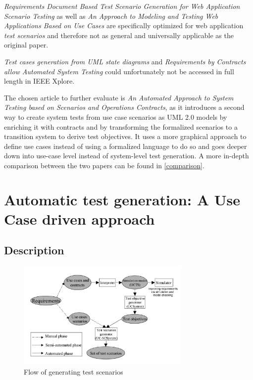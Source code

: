 \textit{Requirements Document Based Test Scenario Generation for Web Application Scenario Testing} as well as \textit{An Approach to Modeling and Testing Web Applications Based on Use Cases} are specifically optimized for web application \textit{test scenarios} and therefore not as general and universally applicable as the original paper.

\textit{Test cases generation from UML state diagrams} and \textit{Requirements by Contracts allow Automated System Testing} could unfortunately not be accessed in full length in IEEE Xplore.

The chosen article to further evaluate is \textit{An Automated Approach to System Testing based on Scenarios and Operations Contracts}, as it introduces a second way to create system tests from use case scenarios as UML 2.0 models by enriching it with contracts and by transforming the formalized scenarios to a transition system to derive test objectives. It uses a more graphical approach to define use cases instead of using a formalized language to do so and goes deeper down into use-case level instead of system-level test generation. A more in-depth comparison between the two papers can be found in \autoref{comparison}.

\section{Automatic test generation: A Use Case driven approach} \label{approachone}

\subsection{Description}

\begin{figure}[h]
	\centering
	\includegraphics[width=0.75\textwidth]{../images/topic3_transitionsystemflow.png}
	\caption{Flow of generating test scenarios \cite{ClementineNebut2006}}
	\label{tsf}
\end{figure}

